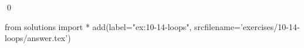 
\begin{ex}
  \label{ex:10-14-loops}
  
  \qed
\end{ex}
\begin{python0}
from solutions import *
add(label="ex:10-14-loops",
    srcfilename='exercises/10-14-loops/answer.tex')
\end{python0}

